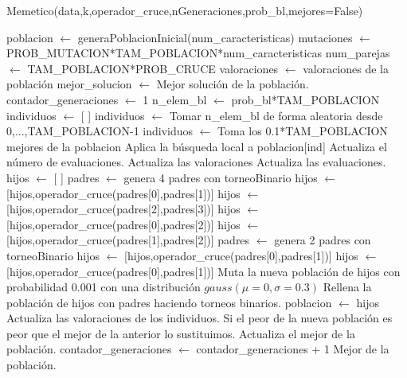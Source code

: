 \documentclass[12pt,a4paper]{article}
\begin{document}
	\begin{algorithm}
		\caption{Memetico(data,k,operador\_cruce,nGeneraciones,prob\_bl,mejores=False)}
		\begin{algorithmic}
			\STATE poblacion $\leftarrow$ generaPoblacionInicial(num\_caracteristicas)
			\STATE mutaciones $\leftarrow$ PROB\_MUTACION*TAM\_POBLACION*num\_caracteristicas
			\STATE num\_parejas $\leftarrow$ TAM\_POBLACION*PROB\_CRUCE
			\STATE valoraciones $\leftarrow$ valoraciones de la población
			\STATE mejor\_solucion $\leftarrow$ Mejor solución de la población.
			\STATE contador\_generaciones $\leftarrow$ 1
					\STATE n\_elem\_bl $\leftarrow$ prob\_bl*TAM\_POBLACION
					\STATE individuos $\leftarrow$ [ ]
						\STATE individuos $\leftarrow$ Tomar n\_elem\_bl de forma aleatoria desde 0,...,TAM\_POBLACION-1
					\ELSE
						\STATE individuos $\leftarrow$ Toma los 0.1*TAM\_POBLACION mejores de la poblacion
					\ENDIF
						\STATE Aplica la búsqueda local a poblacion[ind]
						\STATE Actualiza el número de evaluaciones.
					\ENDFOR
					\STATE Actualiza las valoraciones
					\STATE Actualiza las evaluaciones.
				\ENDIF
				\STATE
				\STATE hijos $\leftarrow$ [ ]
						\STATE padres $\leftarrow$ genera 4 padres con torneoBinario
						\STATE hijos $\leftarrow$ [hijos,operador\_cruce(padres[0],padres[1])]
						\STATE hijos $\leftarrow$ [hijos,operador\_cruce(padres[2],padres[3])]
						\STATE hijos $\leftarrow$ [hijos,operador\_cruce(padres[0],padres[2])]
						\STATE hijos $\leftarrow$ [hijos,operador\_cruce(padres[1],padres[2])]
					\ELSE
						\STATE padres $\leftarrow$ genera 2 padres con torneoBinario
						\STATE hijos $\leftarrow$ [hijos,operador\_cruce(padres[0],padres[1])]
						\STATE hijos $\leftarrow$ [hijos,operador\_cruce(padres[0],padres[1])]
					\ENDIF
				\ENDFOR
				\STATE Muta la nueva población de hijos con probabilidad 0.001 con una distribución $gauss(\mu=0,\sigma=0.3)$
				\STATE Rellena la población de hijos con padres haciendo torneos binarios.
				\STATE poblacion $\leftarrow$ hijos
				\STATE Actualiza las valoraciones de los individuos.
				\STATE Si el peor de la nueva población es peor que el mejor de la anterior lo sustituimos.
				\STATE Actualiza el mejor de la población.
				\STATE contador\_generaciones $\leftarrow$ contador\_generaciones + 1
			\ENDWHILE
			\RETURN Mejor de la población.
		\end{algorithmic}
	\end{algorithm}
\end{document}
